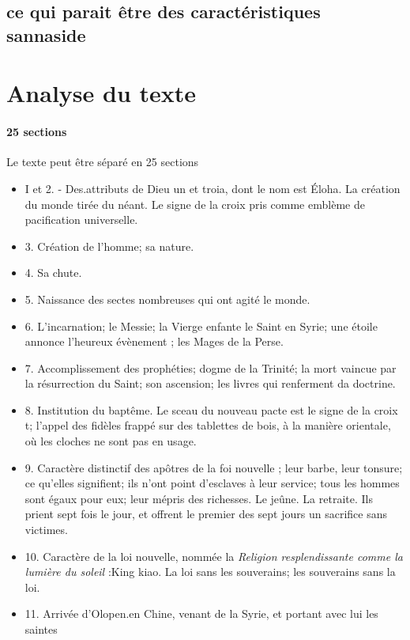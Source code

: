 \subsection{ce qui parait être des caractéristiques sannaside}

\section{Analyse du texte}

\paragraph{25 sections} Le texte peut être séparé en 25 sections \cite{Pauthier:linscriptionSinganfou,p.24}
\begin{itemize}
    \item  I et 2. - Des.attributs de Dieu un et troia, dont le nom est Éloha. La création du monde tirée du néant. Le signe de la croix pris comme emblème de pacification universelle.
    \item 3. Création de l'homme; sa nature.
    \item 4. Sa chute. 
    \item 5. Naissance des sectes nombreuses qui ont agité le monde. 
    \item 6. L'incarnation; le Messie; la Vierge enfante le Saint en Syrie; une étoile annonce l'heureux évènement
; les Mages de la Perse. 
    \item 7. Accomplissement des prophéties; dogme de la Trinité; la mort vaincue par la résurrection du Saint; son ascension; les
livres qui renferment da doctrine. 
    \item 8. Institution du baptême. Le sceau du nouveau
pacte est le signe de la croix t; l'appel des fidèles frappé sur des tablettes
de bois, à la manière orientale, où les cloches ne sont pas en usage. 
    \item 9. Caractère
distinctif des apôtres de la foi nouvelle ; leur barbe, leur tonsure; ce qu'elles
signifient; ils n'ont point d'esclaves à leur service; tous les hommes sont égaux
pour eux; leur mépris des richesses. Le jeûne. La retraite. Ils prient sept fois le
jour, et offrent le premier des sept jours un sacrifice sans victimes.
    \item 10. Caractère
de la loi nouvelle, nommée la \textit{Religion resplendissante comme la lumière du
soleil }:King kiao. La loi sans les souverains; les souverains sans la loi. 
    \item
11. Arrivée d'Olopen.en Chine, venant de la Syrie, et portant avec lui les saintes

\end{itemize}
